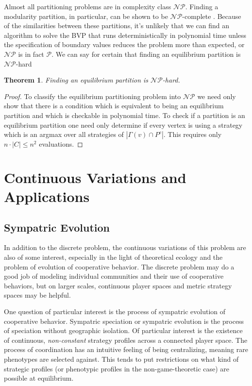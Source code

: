 \documentclass[]{article}
\newtheorem{theorem}{Theorem}
\begin{document}
		Almost all partitioning problems are in complexity class $\mathcal{NP}$. Finding a modularity partition, in particular, can be shown to be $\mathcal{NP}$-complete \cite{Brandes2006}. Because of the similarities between these partitions, it's unlikely that we can find an algorithm to solve the BVP that runs deterministically in polynomial time unless the specification of boundary values reduces the problem more than expected, or $\mathcal{NP}$ is in fact $\mathcal{P}$. We can say for certain that finding an equilibrium partition is $\mathcal{NP}$-hard
		
		\begin{theorem} Finding an equilibrium partition is $\mathcal{NP}$-hard.
		\end{theorem}
		\begin{proof}
				To classify the equilibrium partitioning problem into $\mathcal{NP}$ we need only show that there is a condition which is equivalent to being an equilibrium partition and which is checkable in polynomial time\cite{Sipser2006}. To check if a partition is an equilibrium partition one need only determine if every vertex is using a strategy which is an argmax over all strategies of $|\Gamma(v)\cap P^c|$. This requires only $n\cdot |C|\leq n^2$ evaluations.  
		\end{proof}


	\section{Continuous Variations and Applications}\label{continuousvariations}
	\subsection{Sympatric Evolution} \label{sympatricevoluiton}
		In addition to the discrete problem, the continuous variations of this problem are also of some interest, especially in the light of theoretical ecology and the problem of evolution of cooperative behavior.
		The discrete problem may do a good job of modeling individual communities and their use of cooperative behaviors, but on larger scales, continuous player spaces and metric strategy spaces may be helpful. 
		
		One question of particular interest is the process of sympatric evolution of cooperative behavior. Sympatric speciation or sympatric evolution is the process of speciation without geographic isolation. Of particular interest is the existence of continuous, \textit{non-constant} strategy profiles across a connected player space. The process of coordination has an intuitive feeling of being centralizing, meaning rare phenotypes are selected against. This tends to put restrictions on what kind of strategic profiles (or phenotypic profiles in the non-game-theoretic case) are possible at equilibrium.  
\end{document}
